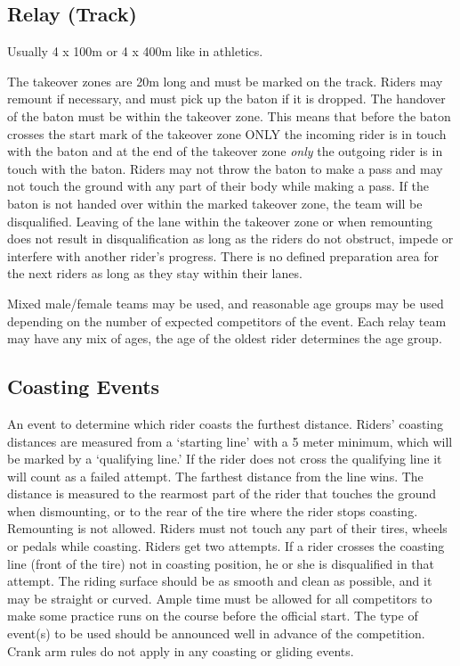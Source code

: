 \subsection{Relay (Track)}
Usually 4 x 100m or 4 x 400m like in athletics.

The takeover zones are 20m long and must be marked on the track.
Riders may remount if necessary, and must pick up the baton if it is dropped.
The handover of the baton must be within the takeover zone.
This means that before the baton crosses the start mark of the takeover zone ONLY the incoming rider is in touch with the baton and at the end of the takeover zone \textit{only} the outgoing rider is in touch with the baton.
Riders may not throw the baton to make a pass and may not touch the ground with any part of their body while making a pass.
If the baton is not handed over within the marked takeover zone, the team will be disqualified.
Leaving of the lane within the takeover zone or when remounting does not result in disqualification as long as the riders do not obstruct, impede or interfere with another rider's progress.
There is no defined preparation area for the next riders as long as they stay within their lanes.

Mixed male/female teams may be used, and reasonable age groups may be used depending on the number of expected competitors of the event.
Each relay team may have any mix of ages, the age of the oldest rider determines the age group.

\subsection{Coasting Events}
An event to determine which rider coasts the furthest distance.
Riders' coasting distances are measured from a ‘starting line' with a 5 meter minimum, which will be marked by a `qualifying line.'
If the rider does not cross the qualifying line it will count as a failed attempt.
The farthest distance from the line wins.
The distance is measured to the rearmost part of the rider that touches the ground when dismounting, or to the rear of the tire where the rider stops coasting.
Remounting is not allowed.
Riders must not touch any part of their tires, wheels or pedals while coasting.
Riders get two attempts.
If a rider crosses the coasting line (front of the tire) not in coasting position, he or she is disqualified in that attempt.
The riding surface should be as smooth and clean as possible, and it may be straight or curved.
Ample time must be allowed for all competitors to make some practice runs on the course before the official start.
The type of event(s) to be used should be announced well in advance of the competition.
Crank arm rules do not apply in any coasting or gliding events.

